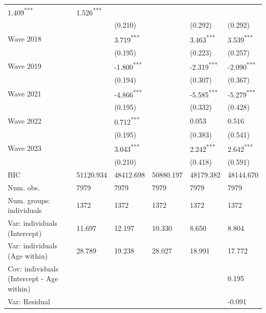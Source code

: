 \documentclass[
  spanish,
  a4paper,
  oneside]{scrbook}
\begin{document}
{\begin{longtable}[]{@{}llllll@{}}
1.409\textsuperscript{***} & 1.526\textsuperscript{***} \\
~ & ~ & (0.210) & ~ & (0.292) & (0.292) \\
Wave 2018 & ~ & 3.719\textsuperscript{***} & ~ &
3.463\textsuperscript{***} & 3.539\textsuperscript{***} \\
~ & ~ & (0.195) & ~ & (0.223) & (0.257) \\
Wave 2019 & ~ & -1.800\textsuperscript{***} & ~ &
-2.319\textsuperscript{***} & -2.090\textsuperscript{***} \\
~ & ~ & (0.194) & ~ & (0.307) & (0.367) \\
Wave 2021 & ~ & -4.866\textsuperscript{***} & ~ &
-5.585\textsuperscript{***} & -5.279\textsuperscript{***} \\
~ & ~ & (0.195) & ~ & (0.332) & (0.428) \\
Wave 2022 & ~ & 0.712\textsuperscript{***} & ~ & 0.053 & 0.516 \\
~ & ~ & (0.195) & ~ & (0.383) & (0.541) \\
Wave 2023 & ~ & 3.043\textsuperscript{***} & ~ &
2.242\textsuperscript{***} & 2.642\textsuperscript{***} \\
~ & ~ & (0.210) & ~ & (0.418) & (0.591) \\
BIC & 51120.934 & 48412.698 & 50880.197 & 48179.382 & 48144.670 \\
Num. obs. & 7979 & 7979 & 7979 & 7979 & 7979 \\
Num. groups: individuals & 1372 & 1372 & 1372 & 1372 & 1372 \\
Var: individuals (Intercept) & 11.697 & 12.197 & 10.330 & 8.650 &
8.804 \\
Var: individuals (Age within) & 28.789 & 19.238 & 28.027 & 18.991 &
17.772 \\
Cov: individuals (Intercept - Age within) & ~ & ~ & ~ & ~ & 0.195 \\
Var: Residual & ~ & ~ & ~ & ~ & -0.091 \\

\end{longtable}

}
\end{document}
